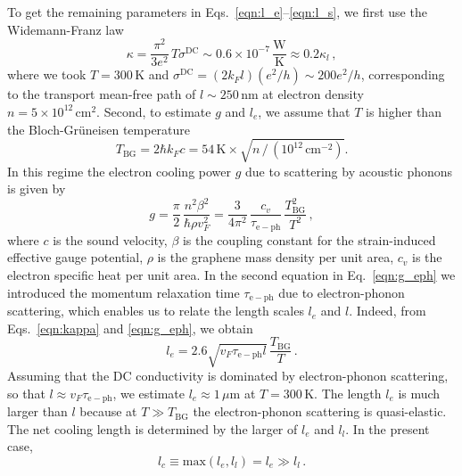 \documentclass[aps, prb, reprint, superscriptaddress]{revtex4-2}
\begin{document}
To get the remaining parameters in Eqs.~\eqref{eqn:l_e}--\eqref{eqn:l_s},
we first use the Widemann-Franz law
\begin{equation}
	\kappa = \frac{\pi^2}{3 e^2}\, T \sigma^{\mathrm{DC}} \sim 0.6 \times 10^{-7}\, \frac{\mathrm{W}}{\mathrm{K}} \approx 0.2 \kappa_l\,,
	\label{eqn:kappa}
\end{equation}
where we took $T = 300\,\mathrm{K}$ and
$\sigma^{\mathrm{DC}} = (2 k_F l)(e^2 / h) \sim 200 e^2 / h$,
corresponding to the transport mean-free path of $l \sim 250\, \mathrm{nm}$
at electron density $n = 5 \times 10^{12}\,\mathrm{cm}^2$.
Second, to estimate $g$ and $l_e$, we 
assume that $T$ is higher than the Bloch-Gr\"uneisen temperature
\begin{equation}
	T_{\mathrm{BG}} = 2 \hbar k_F c = 54\,\mathrm{K}\times
	\sqrt{n \,/\, (10^{12}\,\mathrm{cm}^{-2})}.
	\label{eqn:T_BG}
\end{equation}
In this regime the electron cooling power
$g$ due to scattering by acoustic phonons is given by~\cite{Bistritzer2009,Sohier2014}
\begin{equation}
	g = \frac{\pi}{2}\, \frac{n^2 \beta^2}{\hbar \rho v_F^2}
	= \frac{3}{4\pi^2}\,
	\frac{c_v}{\tau_\mathrm{e-ph}}
	\, \frac{T_{\mathrm{BG}}^2}{T^2}\,,
	\label{eqn:g_eph}
\end{equation}
where $c$ is the sound velocity,
$\beta$ is the coupling constant for the strain-induced effective gauge potential, $\rho$ is the graphene mass density per unit area, $c_v$ is the electron specific heat per unit area.
In the second equation in Eq.~\eqref{eqn:g_eph} we
introduced the momentum relaxation time $\tau_\mathrm{e-ph}$
due to electron-phonon scattering,
which enables us to relate the length scales $l_e$ and $l$.
Indeed, from Eqs.~\eqref{eqn:kappa} and \eqref{eqn:g_eph},
we obtain
\begin{equation}
	l_e = 2.6 \sqrt{v_F \tau_\mathrm{e-ph} l}\, \frac{T_{\mathrm{BG}}}{T}\,.
	\label{eqn:l_e_from_tau}
\end{equation}
Assuming that the DC conductivity is dominated by electron-phonon scattering,
so that $l \approx v_F \tau_\mathrm{e-ph}$, we estimate $l_e \approx 1\,\mu\mathrm{m}$ at $T = 300\,\mathrm{K}$.
The length $l_e$ is much larger than $l$ because
at $T \gg T_{\mathrm{BG}}$ the electron-phonon scattering is quasi-elastic.
The net cooling length is determined by the larger of $l_e$ and $l_l$.
In the present case,
\begin{equation}
	l_c \equiv \mathrm{max}(l_e, l_l) = l_e \gg l_l\,.
	\label{eqn:l_c}
\end{equation}
\end{document}
